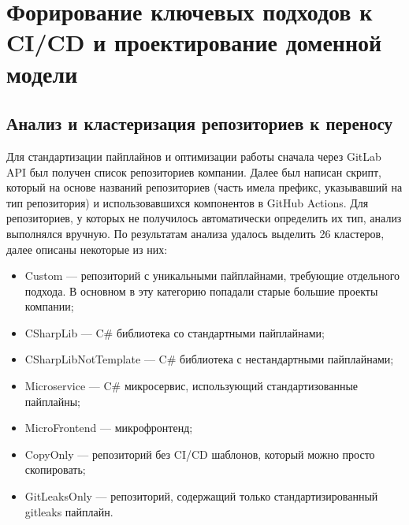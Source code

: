 \chapter{Форирование ключевых подходов к CI/CD и проектирование доменной модели} \label{ch:ch2}

\section{Анализ и кластеризация репозиториев к переносу} \label{sec:repository-analysis}
Для стандартизации пайплайнов и оптимизации работы сначала через GitLab API был получен список репозиториев компании.
Далее был написан скрипт, который на основе названий репозиториев (часть имела префикс, указывавший на тип репозитория) и использовавшихся компонентов в GitHub Actions.
Для репозиториев, у которых не получилось автоматически определить их тип, анализ выполнялся вручную.
По результатам анализа удалось выделить 26 кластеров, далее описаны некоторые из них:
\begin{itemize}
  \item Custom — репозиторий с уникальными пайплайнами, требующие отдельного подхода.
        В основном в эту категорию попадали старые большие проекты компании;
  \item CSharpLib — C\# библиотека со стандартными пайплайнами;
  \item CSharpLibNotTemplate — C\# библиотека с нестандартными пайплайнами;
  \item Microservice — C\# микросервис, использующий стандартизованные пайплайны;
  \item MicroFrontend — микрофронтенд;
  \item CopyOnly — репозиторий без CI/CD шаблонов, который можно просто скопировать;
  \item GitLeaksOnly — репозиторий, содержащий только стандартизированный gitleaks пайплайн.
\end{itemize}

